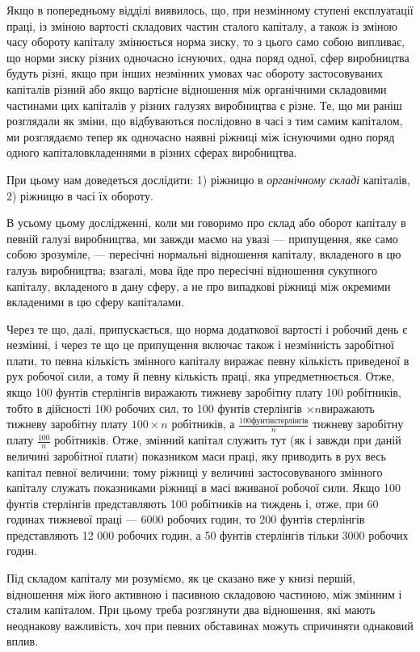 Якщо в попередньому відділі виявилось, що, при незмінному
ступені експлуатації праці, із зміною вартості складових частин
сталого капіталу, а також із зміною часу обороту капіталу змінюється
норма зиску, то з цього само собою випливає, що
норми зиску різних одночасно існуючих, одна поряд одної, сфер
виробництва будуть різні, якщо при інших незмінних умовах
час обороту застосовуваних капіталів різний або якщо вартісне
відношення між органічними складовими частинами цих капіталів
у різних галузях виробництва є різне. Те, що ми раніш
розглядали як зміни, що відбуваються послідовно в часі
з тим самим капіталом, ми розглядаємо тепер як одночасно
наявні ріжниці між існуючими одно поряд одного капіталовкладеннями
в різних сферах виробництва.

При цьому нам доведеться дослідити: 1) ріжницю в \emph{органічному
складі} капіталів, 2) ріжницю в часі їх обороту.

В усьому цьому дослідженні, коли ми говоримо про склад
або оборот капіталу в певній галузі виробництва, ми завжди
маємо на увазі — припущення, яке само собою зрозуміле, — пересічні
нормальні відношення капіталу, вкладеного в цю галузь
виробництва; взагалі, мова йде про пересічні відношення сукупного
капіталу, вкладеного в дану сферу, а не про випадкові
ріжниці між окремими вкладеними в цю сферу капіталами.

Через те що, далі, припускається, що норма додаткової вартості
і робочий день є незмінні, і через те що це припущення
включає також і незмінність заробітної плати, то певна кількість
змінного капіталу виражає певну кількість приведеної
в рух робочої сили, а тому й певну кількість праці, яка упредметнюється.
Отже, якщо 100 фунтів стерлінгів виражають тижневу
заробітну плату 100 робітників, тобто в дійсності 100 робочих
сил, то 100 фунтів стерлінгів $×n $виражають тижневу
заробітну плату $100 × n$ робітників, а $\frac{100 фунтів стерлінгів}{n}$ тижневу
заробітну плату $\frac{100}{n}$ робітників. Отже, змінний капітал служить
тут (як і завжди при даній величині заробітної плати) показником
маси праці, яку приводить в рух весь капітал певної величини;
тому ріжниці у величині застосовуваного змінного капіталу
служать показниками ріжниці в масі вживаної робочої сили. Якщо
100 фунтів стерлінгів представляють 100 робітників на тиждень
і, отже, при 60 годинах тижневої праці — 6000 робочих годин, то
200 фунтів стерлінгів представляють 12 000 робочих годин, а 50
фунтів стерлінгів тільки 3000 робочих годин.

Під складом капіталу ми розуміємо, як це сказано вже у
книзі першій, відношення між його активною і пасивною складовою
частиною, між змінним і сталим капіталом. При цьому
треба розглянути два відношення, які мають неоднакову важливість,
хоч при певних обставинах можуть спричиняти однаковий
вплив.

